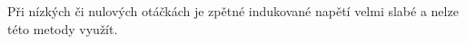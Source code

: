 Při nízkých či nulových otáčkách je zpětné indukované napětí velmi slabé a nelze této metody využít.

